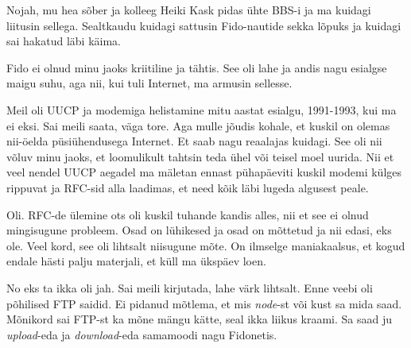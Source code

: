 
Nojah, mu hea sõber ja kolleeg Heiki Kask pidas ühte 
BBS-i ja ma kuidagi liitusin sellega. Sealtkaudu kuidagi sattusin  Fido-nautide 
sekka lõpuks ja kuidagi sai hakatud läbi käima. 


Fido ei olnud minu jaoks kriitiline ja tähtis. See oli lahe ja andis nagu 
esialgse maigu suhu, aga nii, kui tuli Internet, ma armusin sellesse.


Meil oli  UUCP ja modemiga helistamine mitu aastat esialgu, 1991-1993, kui ma 
ei eksi. Sai meili saata, väga tore. Aga mulle jõudis kohale, et kuskil on 
olemas nii-öelda püsiühendusega Internet. Et saab nagu reaalajas 
kuidagi. See oli nii võluv minu jaoks, et 
loomulikult tahtsin teda ühel või teisel moel uurida. Nii et veel nendel UUCP 
aegadel ma mäletan ennast pühapäeviti kuskil modemi külges rippuvat ja RFC-sid 
alla laadimas, et need kõik läbi lugeda algusest peale.


Oli. RFC-de ülemine ots oli kuskil tuhande kandis alles, nii et see ei olnud 
mingisugune probleem. Osad on lühikesed ja osad on mõttetud ja nii edasi, eks 
ole. Veel kord, see oli lihtsalt niisugune mõte. On ilmselge maniakaalsus, et 
kogud endale hästi palju materjali, et küll ma ükspäev loen.


No eks ta ikka oli jah. Sai meili kirjutada, lahe värk lihtsalt. Enne veebi oli 
põhilised FTP saidid. Ei pidanud mõtlema, et mis \emph{node}-st või kust sa 
mida saad.  Mõnikord sai FTP-st ka mõne mängu kätte, seal ikka liikus kraami. 
Sa saad ju \emph{upload}-eda ja \emph{download}-eda samamoodi nagu Fidonetis. 

